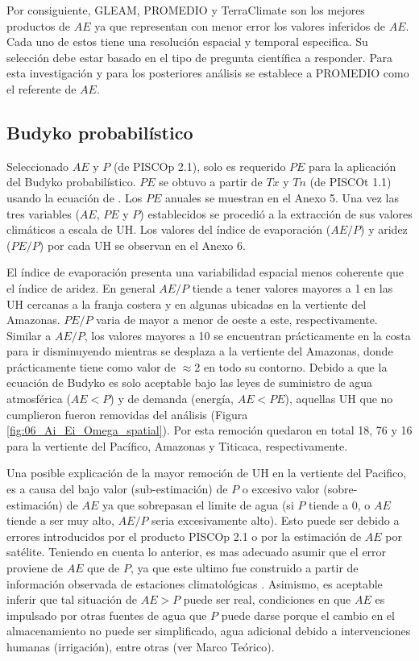\documentclass[12pt]{article}
\begin{document}
Por consiguiente, GLEAM, PROMEDIO y TerraClimate son los mejores productos de $AE$ ya que representan con menor error los valores inferidos de $AE$. Cada uno de estos tiene una resolución espacial y temporal especifica. Su selección debe estar basado en el tipo de pregunta científica a responder. Para esta investigación y para los posteriores análisis se establece a PROMEDIO como el referente de $AE$.

\subsection{Budyko probabilístico}

Seleccionado $AE$ y $P$ (de PISCOp 2.1), solo es requerido $PE$ para la aplicación del Budyko probabilístico. $PE$ se obtuvo a partir de $Tx$ y $Tn$ (de PISCOt 1.1) usando la ecuación de \citet{Hargreaves1985}. Los $PE$ anuales se muestran en el Anexo 5. Una vez las tres variables ($AE$, $PE$ y $P$) establecidos se procedió a la extracción de sus valores climáticos a escala de UH. Los valores del índice de evaporación ($AE/P$) y aridez ($PE/P$) por cada UH se observan en el Anexo 6. 

El índice de evaporación presenta una variabilidad espacial menos coherente que el índice de aridez. En general $AE/P$ tiende a tener valores mayores a 1 en las UH cercanas a la franja costera y en algunas ubicadas en la vertiente del Amazonas. $PE/P$ varia de mayor a menor de oeste a este, respectivamente. Similar a $AE/P$, los valores mayores a 10 se encuentran prácticamente en la costa para ir disminuyendo mientras se desplaza a la vertiente del Amazonas, donde prácticamente tiene como valor de $\approx$2 en todo su contorno. Debido a que la ecuación de Budyko es solo aceptable bajo las leyes de suministro de agua atmosférica ($AE < P$) y de demanda (energía, $AE < PE$), aquellas UH que no cumplieron fueron removidas del análisis (Figura \ref{fig:06_Ai_Ei_Omega_spatial}). Por esta remoción quedaron en total 18, 76 y 16 para la vertiente del Pacífico, Amazonas y Titicaca, respectivamente.

Una posible explicación de la mayor remoción de UH en la vertiente del Pacifico, es a causa del bajo valor (sub-estimación) de $P$ o excesivo valor (sobre-estimación) de $AE$ ya que sobrepasan el limite de agua (si $P$ tiende a 0, o $AE$ tiende a ser muy alto, $AE/P$ seria excesivamente alto). Esto puede ser debido a errores introducidos por el producto PISCOp 2.1 o por la estimación de $AE$ por satélite. Teniendo en cuenta lo anterior, es mas adecuado asumir que el error proviene de $AE$ que de $P$, ya que este ultimo fue construido a partir de información observada de estaciones climatológicas \citep{Aybar2019}. Asimismo, es aceptable inferir que tal situación de $AE > P$ puede ser real, condiciones en que $AE$ es impulsado por otras fuentes de agua que $P$ puede darse porque el cambio en el almacenamiento no puede ser simplificado, agua adicional debido a intervenciones humanas (irrigación), entre otras (ver Marco Teórico).
  
\end{document}
